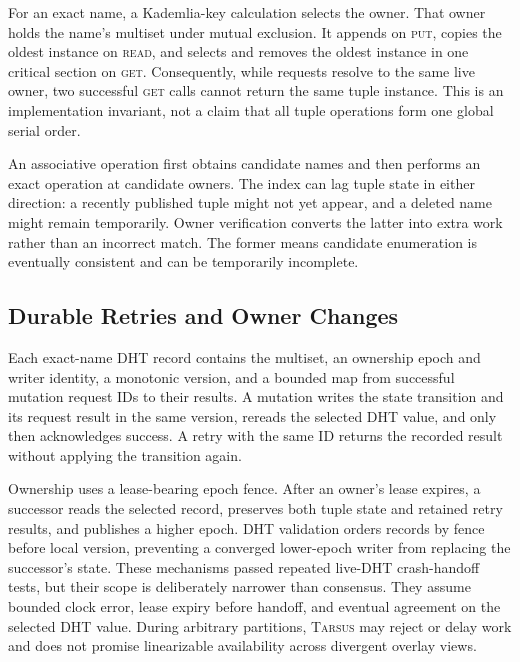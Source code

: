 \documentclass[conference]{IEEEtran}
\newcommand{\system}{\textsc{Tarsus}\xspace}
\newcommand{\putop}{\textsc{put}\xspace}
\newcommand{\readop}{\textsc{read}\xspace}
\newcommand{\getop}{\textsc{get}\xspace}
\begin{document}
For an exact name, a Kademlia-key calculation selects the owner. That owner
holds the name's multiset under mutual exclusion. It appends on \putop, copies
the oldest instance on \readop, and selects and removes the oldest instance in
one critical section on \getop. Consequently, while requests resolve to the
same live owner, two successful \getop calls cannot return the same tuple
instance. This is an implementation invariant, not a claim that all tuple
operations form one global serial order.

An associative operation first obtains candidate names and then performs an
exact operation at candidate owners. The index can lag tuple state in either
direction: a recently published tuple might not yet appear, and a deleted name
might remain temporarily. Owner verification converts the latter into extra
work rather than an incorrect match. The former means candidate enumeration is
eventually consistent and can be temporarily incomplete.

\subsection{Durable Retries and Owner Changes}

Each exact-name DHT record contains the multiset, an ownership epoch and writer
identity, a monotonic version, and a bounded map from successful mutation
request IDs to their results. A mutation writes the state transition and its
request result in the same version, rereads the selected DHT value, and only
then acknowledges success. A retry with the same ID returns the recorded
result without applying the transition again.

Ownership uses a lease-bearing epoch fence. After an owner's lease expires, a
successor reads the selected record, preserves both tuple state and retained
retry results, and publishes a higher epoch. DHT validation orders records by
fence before local version, preventing a converged lower-epoch writer from
replacing the successor's state. These mechanisms passed repeated live-DHT
crash-handoff tests, but their scope is deliberately narrower than consensus.
They assume bounded clock error, lease expiry before handoff, and eventual
agreement on the selected DHT value. During arbitrary partitions, \system may
reject or delay work and does not promise linearizable availability across
divergent overlay views.
\end{document}
